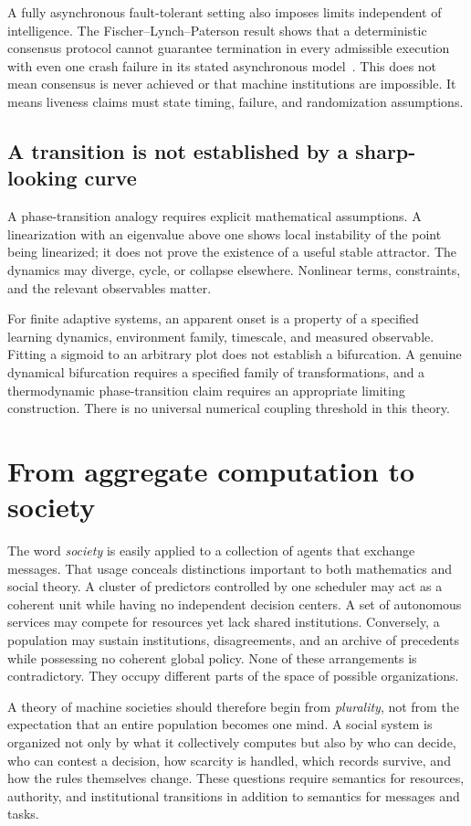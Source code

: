 \documentclass[11pt,letterpaper]{article}
\theoremstyle{plain}
\theoremstyle{definition}
\theoremstyle{remark}
\begin{document}
A fully asynchronous fault-tolerant setting also imposes limits independent of intelligence. The Fischer--Lynch--Paterson result shows that a deterministic consensus protocol cannot guarantee termination in every admissible execution with even one crash failure in its stated asynchronous model~\cite{flp}. This does not mean consensus is never achieved or that machine institutions are impossible. It means liveness claims must state timing, failure, and randomization assumptions.

\subsection{A transition is not established by a sharp-looking curve}
A phase-transition analogy requires explicit mathematical assumptions. A linearization with an eigenvalue above one shows local instability of the point being linearized; it does not prove the existence of a useful stable attractor. The dynamics may diverge, cycle, or collapse elsewhere. Nonlinear terms, constraints, and the relevant observables matter.

For finite adaptive systems, an apparent onset is a property of a specified learning dynamics, environment family, timescale, and measured observable. Fitting a sigmoid to an arbitrary plot does not establish a bifurcation. A genuine dynamical bifurcation requires a specified family of transformations, and a thermodynamic phase-transition claim requires an appropriate limiting construction. There is no universal numerical coupling threshold in this theory.

\section{From aggregate computation to society}\label{sec:society}

The word \emph{society} is easily applied to a collection of agents that exchange messages. That usage conceals distinctions important to both mathematics and social theory. A cluster of predictors controlled by one scheduler may act as a coherent unit while having no independent decision centers. A set of autonomous services may compete for resources yet lack shared institutions. Conversely, a population may sustain institutions, disagreements, and an archive of precedents while possessing no coherent global policy. None of these arrangements is contradictory. They occupy different parts of the space of possible organizations.

A theory of machine societies should therefore begin from \emph{plurality}, not from the expectation that an entire population becomes one mind. A social system is organized not only by what it collectively computes but also by who can decide, who can contest a decision, how scarcity is handled, which records survive, and how the rules themselves change. These questions require semantics for resources, authority, and institutional transitions in addition to semantics for messages and tasks.
\end{document}
